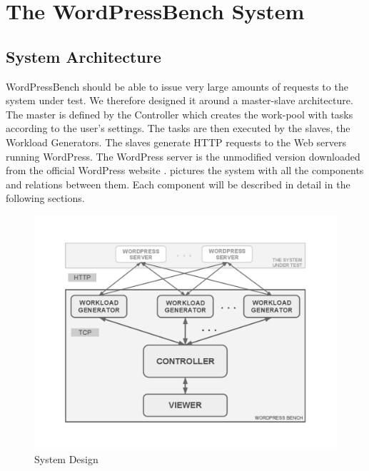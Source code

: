 \chapter{The WordPressBench System}
\label{chapter:chapter4}


\section{System Architecture}
\label{sub-sec:system-architecture}

WordPressBench should be able to issue very large amounts of requests to the system under test. We therefore designed it around a master-slave architecture. The master is defined by the Controller which creates the work-pool with tasks according to the user's settings. The tasks are then executed by the slaves, the Workload Generators. The slaves generate HTTP requests to the Web servers running WordPress. The WordPress server is the unmodified version downloaded from the official WordPress website \cite{Wordpress-download}.  pictures the system with all the components and relations between them. Each component will be described in detail in the following sections.

  \begin{figure}[htb]
    \begin{center}
    \includegraphics[trim=2.5cm 2.5cm 2.5cm 2.5cm, clip=true, scale=0.65]{src/img/WordPressBench.pdf}
    \caption{System Design}
    \end{center}
  \label{figure:system-design}
  \end{figure}


